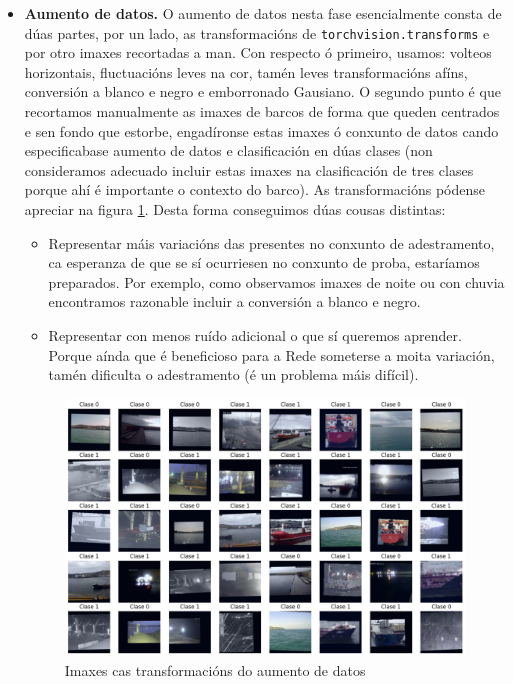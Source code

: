 \documentclass{article}
\begin{document}
\begin{itemize}
	\item \textbf{Aumento de datos.} O aumento de datos nesta fase esencialmente consta de dúas partes, por un lado, as transformacións de \texttt{torchvision.transforms} e por otro imaxes recortadas a man. Con respecto ó  primeiro, usamos: volteos horizontais, fluctuacións leves na cor, tamén leves transformacións afíns, conversión a blanco e negro e emborronado Gausiano. O segundo punto é que recortamos manualmente as imaxes de barcos de forma que queden centrados e sen fondo que estorbe, engadíronse estas imaxes ó conxunto de datos cando especificabase aumento de datos e clasificación en dúas clases (non consideramos adecuado incluir estas imaxes na clasificación de tres clases porque ahí é importante o contexto do barco). As transformacións pódense apreciar na figura \ref{fig:aumento}. Desta forma conseguimos dúas cousas distintas: 
	\begin{itemize}
		\item Representar máis variacións das presentes no conxunto de adestramento, ca esperanza de que se sí ocurriesen no conxunto de proba, estaríamos preparados. Por exemplo, como observamos imaxes de noite ou con chuvia encontramos razonable incluir a conversión a blanco e negro.
		\item Representar con menos ruído adicional o que sí queremos aprender. Porque aínda que é beneficioso para a Rede someterse a moita variación, tamén dificulta o adestramento (é un problema máis difícil).
\end{itemize}

\begin{figure}[h]
	\centering
	\includegraphics[width=0.9\linewidth]{aumentoDatosEx1.png}
	\caption{Imaxes cas transformacións do aumento de datos}
	\label{fig:aumento}
\end{figure}


\end{itemize}
\end{document}
